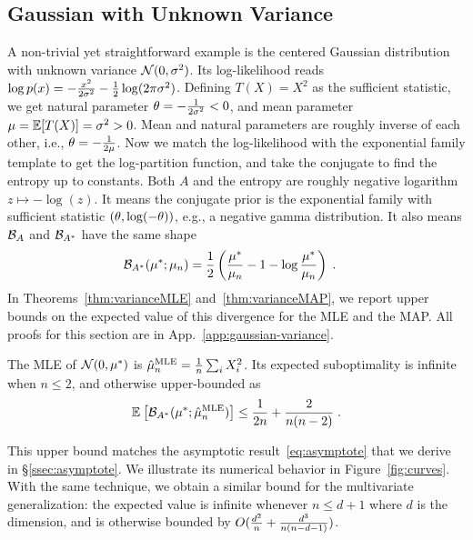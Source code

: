 \subsection{Gaussian with Unknown Variance}\label{ssec:gaussian-variance}

A non-trivial yet straightforward example is the centered Gaussian distribution with unknown variance ${\mathcal N}(0,\sigma^2)$.
Its log-likelihood reads $\log p(x) = -\frac{x^2}{2 \sigma^2} - \frac{1}{2}\log(2\pi \sigma^2)$.
Defining $T(X)=X^2$ as the sufficient statistic, we get natural parameter $\theta = -\frac{1}{2 \sigma^2} <0$, and mean parameter $\mu=\operatorname{\mathbb{E}}[T(X)] = \sigma^2 >0$.
Mean and natural parameters are roughly inverse of each other, i.e., $\theta = -\frac{1}{2 \mu}$.
Now we match the log-likelihood with the exponential family template to get the log-partition function, and take the conjugate to find the entropy
up to constants.
Both $A$ and  the entropy are roughly negative logarithm $z\mapsto - \log(z)$.
It means the conjugate prior is the exponential family with sufficient statistic $(\theta, \log(-\theta) )$, e.g., a negative gamma distribution.
It also means ${\mathcal B}_A$ and ${\mathcal B}_{A^*}$ have the same shape
\begin{align}
	{\mathcal B}_{A^*}( \mu^*; \mu_n)
	&= \frac{1}{2} \left ( \frac{\mu^*}{ \mu_n} - 1 - \log  \frac{\mu^*}{ \mu_n} \right) \; .
\end{align}
In Theorems~\ref{thm:varianceMLE} and~\ref{thm:varianceMAP}, we report upper bounds on the expected value of this divergence for the MLE and the MAP.
All proofs for this section are in App.~\ref{app:gaussian-variance}.
\begin{theorem}
\label{thm:varianceMLE}
	The MLE of ${\mathcal N}(0,\mu^*)$ is $\hat {\mu}_n^\text{MLE} = \frac{1}{n} \sum_i X_i^2 $.
	Its expected suboptimality is infinite when $n\leq 2$, and otherwise upper-bounded as
	\begin{align}
		 \mathbb{E}_{} \left[ {\mathcal B}_{A^*}( \mu^*; \hat {\mu}_n^\text{MLE})  \right] 
			\leq \frac{1}{2n} +\frac{2}{n(n-2)} \; .
			\label{eq:MLE_rate}
	\end{align}
\end{theorem}
This upper bound matches the asymptotic result~\eqref{eq:asymptote} that we derive in \S\ref{ssec:asymptote}.
We illustrate its numerical behavior in Figure~\ref{fig:curves}.
With the same technique, we obtain a similar bound for the multivariate generalization: the expected value is infinite whenever $n \leq d+1$ where $d$ is the dimension, and is otherwise bounded by $O(\frac{d^2}{n} + \frac{d^3}{n(n-d-1)})$.

